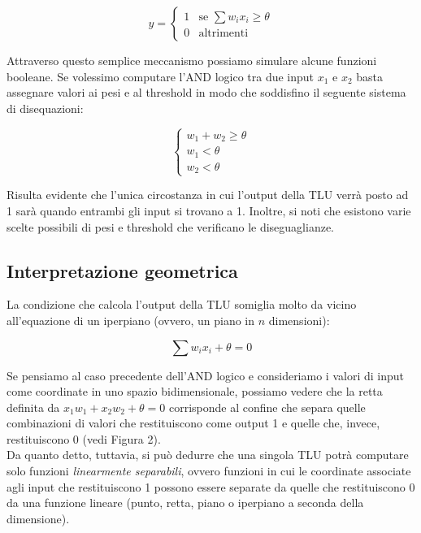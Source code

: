 \documentclass[10pt,a4paper]{article}
\begin{document}
\begin{equation}
y =  \begin{cases}
    1 & \text{se } \sum w_ix_i \geq \theta \\
    0 & \text{altrimenti} 
   \end{cases}
\end{equation}

Attraverso questo semplice meccanismo possiamo simulare alcune funzioni booleane. Se volessimo computare l'AND logico tra due input $x_1$ e $x_2$ basta assegnare valori ai pesi e al threshold in modo che soddisfino il seguente sistema di disequazioni:

\begin{equation}
	\begin{cases}
    w_1 + w_2 \geq \theta \\
    w_1 < \theta\\
    w_2 < \theta
   \end{cases}
\end{equation}

Risulta evidente che l'unica circostanza in cui l'output della TLU verrà posto ad 1 sarà quando entrambi gli input si trovano a 1. Inoltre, si noti che esistono varie scelte possibili di pesi e threshold che verificano le diseguaglianze.

\subsection{Interpretazione geometrica}

La condizione che calcola l'output della TLU somiglia molto da vicino all'equazione di un iperpiano (ovvero, un piano in $n$ dimensioni):

\begin{equation}
	 \sum w_ix_i + \theta = 0 
\end{equation}

Se pensiamo al caso precedente dell'AND logico e consideriamo i valori di input come coordinate in uno spazio bidimensionale, possiamo vedere che la retta definita da $x_1w_1 + x_2w_2 + \theta = 0$ corrisponde al confine che separa quelle combinazioni di valori che restituiscono come output 1 e quelle che, invece, restituiscono 0 (vedi Figura 2). \\
Da quanto detto, tuttavia, si può dedurre che una singola TLU potrà computare solo funzioni \emph{linearmente separabili}, ovvero funzioni in cui le coordinate associate agli input che restituiscono 1 possono essere separate da quelle che restituiscono 0 da una funzione lineare (punto, retta, piano o iperpiano a seconda della dimensione). 
\end{document}
